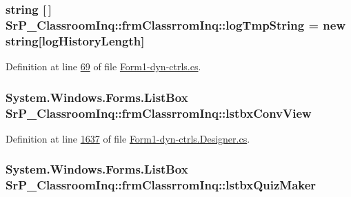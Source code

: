 \hypertarget{class_sr_p___classroom_inq_1_1frm_classrrom_inq_acf11c4997f1ad160ca28e4d7b1489f08}{
\subsubsection[{log\-Tmp\-String}]{\setlength{\rightskip}{0pt plus 5cm}string \mbox{[}$\,$\mbox{]} {\bf \-Sr\-P\-\_\-\-Classroom\-Inq\-::frm\-Classrrom\-Inq\-::log\-Tmp\-String} = new string\mbox{[}{\bf log\-History\-Length}\mbox{]}}}
\label{class_sr_p___classroom_inq_1_1frm_classrrom_inq_acf11c4997f1ad160ca28e4d7b1489f08}


\-Definition at line \hyperlink{_form1-dyn-ctrls_8cs_source_l00069}{69} of file \hyperlink{_form1-dyn-ctrls_8cs_source}{\-Form1-\/dyn-\/ctrls.\-cs}.

\hypertarget{class_sr_p___classroom_inq_1_1frm_classrrom_inq_aa78736e6fefabc449eb2ac37ce4f5f60}{
\subsubsection[{lstbx\-Conv\-View}]{\setlength{\rightskip}{0pt plus 5cm}\-System.\-Windows.\-Forms.\-List\-Box {\bf \-Sr\-P\-\_\-\-Classroom\-Inq\-::frm\-Classrrom\-Inq\-::lstbx\-Conv\-View}}}
\label{class_sr_p___classroom_inq_1_1frm_classrrom_inq_aa78736e6fefabc449eb2ac37ce4f5f60}


\-Definition at line \hyperlink{_form1-dyn-ctrls_8_designer_8cs_source_l01637}{1637} of file \hyperlink{_form1-dyn-ctrls_8_designer_8cs_source}{\-Form1-\/dyn-\/ctrls.\-Designer.\-cs}.

\hypertarget{class_sr_p___classroom_inq_1_1frm_classrrom_inq_af2496f0a0579263d9def95bd23d29c89}{
\subsubsection[{lstbx\-Quiz\-Maker}]{\setlength{\rightskip}{0pt plus 5cm}\-System.\-Windows.\-Forms.\-List\-Box {\bf \-Sr\-P\-\_\-\-Classroom\-Inq\-::frm\-Classrrom\-Inq\-::lstbx\-Quiz\-Maker}}}
\label{class_sr_p___classroom_inq_1_1frm_classrrom_inq_af2496f0a0579263d9def95bd23d29c89}


